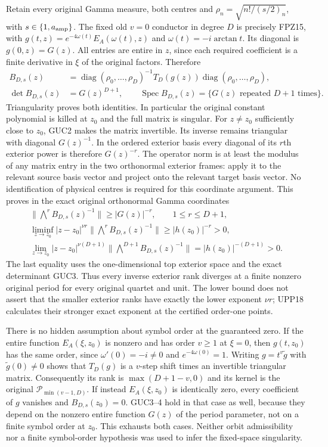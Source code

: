 Retain every original Gamma measure, both centres and
$\rho_n=\sqrt{n!/(s/2)_n}$, with $s\in\{1,a_{\rm amp}\}$.
The fixed old $v=0$ conductor in degree $D$ is precisely FPZ15,
with $g(t,z)=e^{-4\omega(t)}E_A(\omega(t),z)$ and
$\omega(t)=-i\arctan t$. Its diagonal is $g(0,z)=G(z)$.
All entries are entire in $z$, since each required coefficient
is a finite derivative in $\xi$ of the original factors. Therefore
\[
 \begin{split}
 B_{D,s}(z)&=\operatorname{diag}(\rho_0,\ldots,\rho_D)^{-1}
              T_D(g(z))\operatorname{diag}(\rho_0,\ldots,\rho_D),\\
 \det B_{D,s}(z)&=G(z)^{D+1},\qquad
 \operatorname{Spec}B_{D,s}(z)=\{G(z)\text{ repeated }D+1\text{ times}\}.
 \end{split}\tag{GUC3}
\]
Triangularity proves both identities. In particular the original
constant polynomial is killed at $z_0$ and the full matrix is singular.
For $z\ne z_0$ sufficiently close to $z_0$, GUC2 makes the matrix
invertible. Its inverse remains triangular with diagonal $G(z)^{-1}$.
In the ordered exterior basis every diagonal of its $r$th exterior
power is therefore $G(z)^{-r}$. The operator norm is at least the
modulus of any matrix entry in the two orthonormal exterior frames:
apply it to the relevant source basis vector and project onto the
relevant target basis vector. No identification of physical centres
is required for this coordinate argument.
This proves in the exact original orthonormal Gamma coordinates
\[
 \begin{gathered}
 \|\bigwedge^r B_{D,s}(z)^{-1}\|\ge |G(z)|^{-r},
               \qquad 1\le r\le D+1,\\
 \liminf_{z\to z_0}|z-z_0|^{\nu r}
       \|\bigwedge^r B_{D,s}(z)^{-1}\|
            \ge |h(z_0)|^{-r}>0,\\
 \lim_{z\to z_0}|z-z_0|^{\nu(D+1)}
       \|\bigwedge^{D+1}B_{D,s}(z)^{-1}\|
            =|h(z_0)|^{-(D+1)}>0.
 \end{gathered}\tag{GUC4}
\]
The last equality uses the one-dimensional top exterior space and
the exact determinant GUC3. Thus every inverse exterior rank diverges
at a finite nonzero original period for every original quartet and unit.
The lower bound does not assert that the smaller exterior ranks have
exactly the lower exponent $\nu r$; UPP18 calculates their stronger
exact exponent at the certified order-one points.

There is no hidden assumption about symbol order at the guaranteed
zero. If the entire function $E_A(\xi,z_0)$ is nonzero and has order
$v\ge1$ at $\xi=0$, then $g(t,z_0)$ has the same order, since
$\omega'(0)=-i\ne0$ and $e^{-4\omega(0)}=1$.
Writing $g=t^v\widetilde g$ with $\widetilde g(0)\ne0$ shows that
$T_D(g)$ is a $v$-step shift times an invertible triangular matrix.
Consequently its rank is $\max(D+1-v,0)$ and its kernel is the
original $\mathcal P_{\min(v-1,D)}$.
If instead $E_A(\xi,z_0)$ is identically zero, every coefficient
of $g$ vanishes and $B_{D,s}(z_0)=0$. GUC3--4 hold in that case
as well, because they depend on the nonzero entire function $G(z)$
of the period parameter, not on a finite symbol order at $z_0$.
This exhausts both cases. Neither orbit admissibility nor a finite
symbol-order hypothesis was used to infer the fixed-space singularity.

